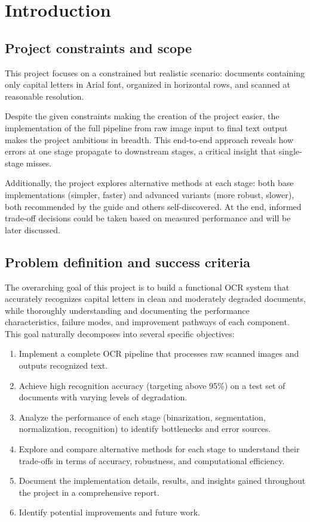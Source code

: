 \setcounter{page}{1}
\section{Introduction}

\subsection{Project constraints and scope}
This project focuses on a constrained but realistic scenario: documents containing only capital letters in Arial font, organized in horizontal rows, and scanned at reasonable resolution.

Despite the given constraints making the creation of the project easier,  the implementation of the full pipeline from raw image input to final text output makes the project ambitious in breadth. This end-to-end approach reveals how errors at one stage propagate to downstream stages, a critical insight that single-stage misses.

Additionally, the project explores alternative methods at each stage: both base implementations (simpler, faster) and advanced variants (more robust, slower), both recommended by the guide and others self-discovered. At the end, informed trade-off decisions could be taken  based on measured performance and will be later discussed. 

\subsection{Problem definition and success criteria}
The overarching goal of this project is to build a functional OCR system that accurately recognizes capital letters in clean and moderately degraded documents, while thoroughly understanding and documenting the performance characteristics, failure modes, and improvement pathways of each component. This goal naturally decomposes into several specific objectives:
\begin{enumerate}
    \item Implement a complete OCR pipeline that processes raw scanned images and outputs recognized text.
    \item Achieve high recognition accuracy (targeting above 95\%) on a test set of documents with varying levels of degradation.
    \item Analyze the performance of each stage (binarization, segmentation, normalization, recognition) to identify bottlenecks and error sources.
    \item Explore and compare alternative methods for each stage to understand their trade-offs in terms of accuracy, robustness, and computational efficiency.
    \item Document the implementation details, results, and insights gained throughout the project in a comprehensive report.
    \item Identify potential improvements and future work.
\end{enumerate}
\newpage
